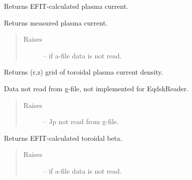 \documentclass[letterpaper,10pt,english]{sphinxmanual}
\begin{document}
\begin{fulllineitems}
\begin{fulllineitems}
\end{fulllineitems}


\begin{fulllineitems}
\label{eqtools:eqtools.eqdskreader.EqdskReader.getIpCalc}
Returns EFIT-calculated plasma current.

\end{fulllineitems}


\begin{fulllineitems}
\label{eqtools:eqtools.eqdskreader.EqdskReader.getIpMeas}
Returns measured plasma current.
\begin{quote}\begin{description}
\item[{Raises}] \leavevmode
{} -- if a-file data is not read.

\end{description}\end{quote}

\end{fulllineitems}


\begin{fulllineitems}
\label{eqtools:eqtools.eqdskreader.EqdskReader.getJp}
Returns (r,z) grid of toroidal plasma current density.

Data not read from g-file, not implemented for EqdskReader.
\begin{quote}\begin{description}
\item[{Raises}] \leavevmode
{} -- Jp not read from g-file.

\end{description}\end{quote}

\end{fulllineitems}


\begin{fulllineitems}
\label{eqtools:eqtools.eqdskreader.EqdskReader.getBetaT}
Returns EFIT-calculated toroidal beta.
\begin{quote}\begin{description}
\item[{Raises}] \leavevmode
{} -- if a-file data is not read.


\end{description}
\end{quote}
\end{fulllineitems}
\end{fulllineitems}
\end{document}
